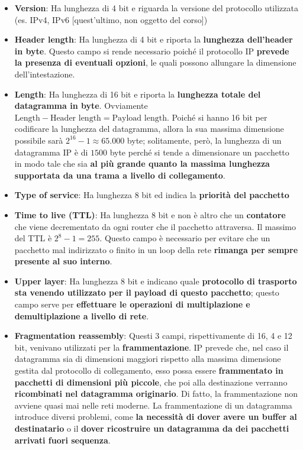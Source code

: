 \documentclass[12pt]{article}
\begin{document}
\begin{itemize}
    \item \textbf{Version}: Ha lunghezza di 4 bit e riguarda la versione del protocollo utilizzata (es. IPv4, IPv6 [quest'ultimo, non oggetto del corso])
    \item \textbf{Header length}: Ha lunghezza di 4 bit e riporta la \textbf{lunghezza dell'header in byte}. Questo campo si rende necessario poiché il protocollo IP \textbf{prevede la presenza di eventuali opzioni}, le quali possono allungare la dimensione dell'intestazione.
    \item \textbf{Length}: Ha lunghezza di 16 bit e riporta la \textbf{lunghezza totale del datagramma in byte}. Ovviamente $\textrm{Length} - \textrm{Header length} = \textrm{Payload length}$. Poiché si hanno 16 bit per codificare la lunghezza del datagramma, allora la sua massima dimensione possibile
    sarà $2^{16} - 1 \approx 65.000$ byte; solitamente, però, la lunghezza di un datagramma IP è di $1500$ byte perché si tende a dimensionare un pacchetto in modo tale che sia \textbf{al più grande quanto la massima lunghezza supportata da una trama a livello di collegamento}.
    \item \textbf{Type of service}: Ha lunghezza 8 bit ed indica la \textbf{priorità del pacchetto}
    \item \textbf{Time to live (TTL)}: Ha lunghezza 8 bit e non è altro che un \textbf{contatore} che viene decrementato da ogni router che il pacchetto attraversa. Il massimo del TTL è $2^8 - 1 = 255$.
    Questo campo è necessario per evitare che un pacchetto mal indirizzato o finito in un loop della rete \textbf{rimanga per sempre presente al suo interno}.
    \item \textbf{Upper layer}: Ha lunghezza 8 bit e indicano quale \textbf{protocollo di trasporto sta venendo utilizzato per il payload di questo pacchetto}; questo campo serve per \textbf{effettuare le operazioni di multiplazione e demultiplazione a livello di rete}.
    \item \textbf{Fragmentation reassembly}: Questi 3 campi, rispettivamente di 16, 4 e 12 bit, venivano utilizzati per la \textbf{frammentazione}. IP prevede che, nel caso il datagramma sia di dimensioni maggiori rispetto alla massima dimensione gestita dal protocollo di collegamento, esso possa essere \textbf{frammentato in pacchetti di dimensioni più piccole}, che poi alla destinazione verranno \textbf{ricombinati nel datagramma originario}.
    Di fatto, la frammentazione non avviene quasi mai nelle reti moderne. La frammentazione di un datagramma introduce diversi problemi, come \textbf{la necessità di dover avere un buffer al destinatario} o il \textbf{dover ricostruire un datagramma da dei pacchetti arrivati fuori sequenza}.

\end{itemize}
\end{document}
